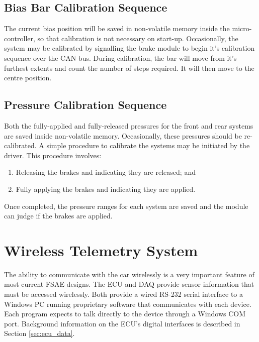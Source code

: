 \subsection{Bias Bar Calibration Sequence}

The current bias position will be saved in non-volatile memory inside the micro-controller, so that calibration is not necessary on start-up. Occasionally, the system may be calibrated by signalling the brake module to begin it's calibration sequence over the CAN bus. During calibration, the bar will move from it's furthest extents and count the number of steps required. It will then move to the centre position.

\subsection{Pressure Calibration Sequence}

Both the fully-applied and fully-released pressures for the front and rear systems are saved inside non-volatile memory. Occasionally, these pressures should be re-calibrated. A simple procedure to calibrate the systems may be initiated by the driver. This procedure involves:

\begin{enumerate}
\item Releasing the brakes and indicating they are released; and
\item Fully applying the brakes and indicating they are applied.
\end{enumerate}

Once completed, the pressure ranges for each system are saved and the module can judge if the brakes are applied.

%
%

\section{Wireless Telemetry System}
\label{wireless_telemetry_system}

The ability to communicate with the car wirelessly is a very important feature of most current FSAE designs. The ECU and DAQ provide sensor information that must be accessed wirelessly. Both provide a wired RS-232 serial interface to a Windows PC running proprietary software that communicates with each device. Each program expects to talk directly to the device through a Windows COM port. Background information on the ECU's digital interfaces is described in Section \ref{sec:ecu_data}.


